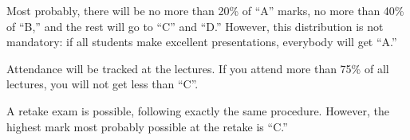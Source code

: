 \documentclass[nobrand,anonymous,nodate,nosecurity]{huawei}
\begin{document}
{Most probably, there will
be no more than 20\% of ``A'' marks, no more than 40\% of ``B,''
and the rest will go to ``C'' and ``D.'' However, this distribution is
not mandatory: if all students make excellent presentations, everybody
will get ``A.''

Attendance will be tracked at the lectures. If you attend more than 75\%
of all lectures, you will not get less than ``C''.




A retake exam is possible, following exactly the same procedure. However,
the highest mark most probably possible at the retake is ``C.''




}
\end{document}
